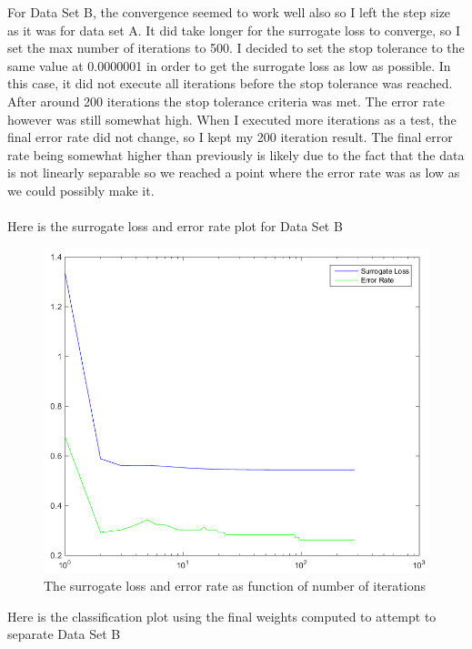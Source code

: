 \documentclass[twoside,11pt]{article}
\theoremstyle{definition}
\begin{document}
\newpage
For Data Set B, the convergence seemed to work well also so I left the step size as it was for data set A. It did take longer for the surrogate loss to converge, so I set the max number of iterations to 500. I decided to set the stop tolerance to the same value at 0.0000001 in order to get the surrogate loss as low as possible. In this case, it did not execute all iterations before the stop tolerance was reached. After around 200 iterations the stop tolerance criteria was met. The error rate however was still somewhat high. When I executed more iterations as a test, the final error rate did not change, so I kept my 200 iteration result. The final error rate being somewhat higher than previously is likely due to the fact that the data is not linearly separable so we reached a point where the error rate was as low as we could possibly make it. \\
\\
Here is the surrogate loss and error rate plot for Data Set B\\
\begin{figure}[h]
\centering
\includegraphics[width=5 in]{prob1fPlotB1.png}
\caption{The surrogate loss and error rate as function of number of iterations}
\end{figure}

\newpage

Here is the classification plot using the final weights computed to attempt to separate Data Set B\\
\end{document}

